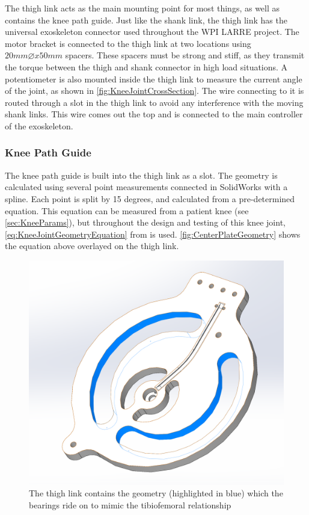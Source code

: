 The thigh link acts as the main mounting point for most things, as well as contains the knee path guide. Just like the shank link, the thigh link has the universal exoskeleton connector used throughout the WPI LARRE project. The motor bracket is connected to the thigh link at two locations using \(20mm\diameter x 50mm\) spacers. These spacers must be strong and stiff, as they transmit the torque between the thigh and shank connector in high load situations. A potentiometer is also mounted inside the thigh link to measure the current angle of the joint, as shown in \autoref{fig:KneeJointCrossSection}. The wire connecting to it is routed through a slot in the thigh link to avoid any interference with the moving shank links. This wire comes out the top and is connected to the main controller of the exoskeleton.

\subsubsection{Knee Path Guide}
The knee path guide is built into the thigh link as a slot. The geometry is calculated using several point measurements connected in SolidWorks with a spline. Each point is split by 15 degrees, and calculated from a pre-determined equation. This equation can be measured from a patient knee (see \autoref{sec:KneeParams}), but throughout the design and testing of this knee joint, \autoref{eq:KneeJointGeometryEquation} from \cite{KinDynKneeJoint} is used. \autoref{fig:CenterPlateGeometry} shows the equation above overlayed on the thigh link.

\begin{figure}[ht!]
    \centering
    \includegraphics[width=0.8\linewidth]{Figures/Design/KneePathGuide.png}
    \caption{The thigh link contains the geometry (highlighted in blue) which the bearings ride on to mimic the tibiofemoral relationship}
    \label{fig:CenterPlateGeometry}
\end{figure}

